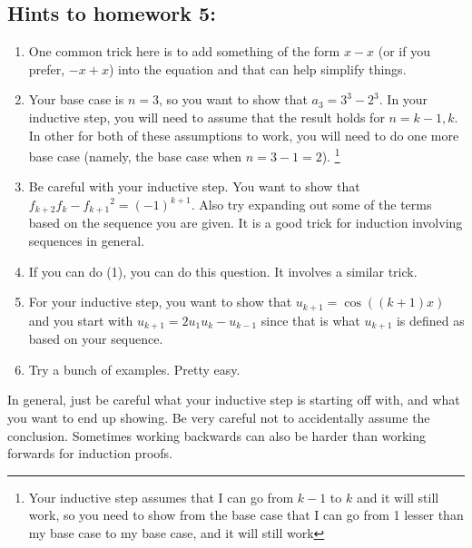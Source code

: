 \documentclass[letterpaper,12pt]{article}
\begin{document}
\subsection*{Hints to homework 5:}
\begin{enumerate}
\item One common trick here is to add something of the form $x - x$ (or if you prefer, $-x + x$) into the equation and that can help simplify things.
\item Your base case is $n = 3$, so you want to show that $a_3 = 3^3 - 2^3$. In your inductive step, you will need to assume that the result holds for $n=k-1,k$. In other for both of these assumptions to work, you will need to do one more base case (namely, the base case when $n=3-1=2$). \footnote{Your inductive step assumes that I can go from $k-1$ to $k$ and it will still work, so you need to show from the base case that I can go from 1 lesser than my base case to my base case, and it will still work} 
\item Be careful with your inductive step. You want to show that $ f_{k+2}f_{k} - {f_{k+1}}^2 = (-1)^{k+1}$. Also try expanding out some of the terms based on the sequence you are given. It is a good trick for induction involving sequences in general.
\item If you can do (1), you can do this question. It involves a similar trick.
\item For your inductive step, you want to show that $u_{k+1} = \cos{((k+1) x)}$ and you start with $u_{k+1} = 2u_1u_{k} - u_{k-1}$ since that is what $u_{k+1}$ is defined as based on your sequence.
\item Try a bunch of examples. Pretty easy.
\end{enumerate}
In general, just be careful what your inductive step is starting off with, and what you want to end up showing. Be very careful not to accidentally assume the conclusion. Sometimes working backwards can also be harder than working forwards for induction proofs.
\end{document}
